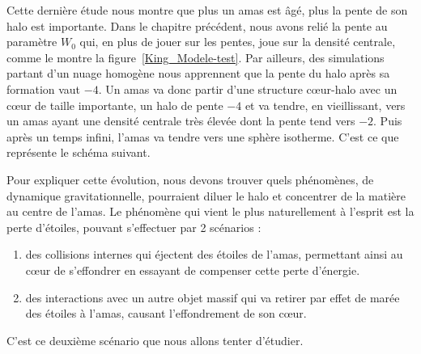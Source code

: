		Cette dernière étude nous montre que plus un amas est âgé, plus la pente de son halo est importante.
		Dans le chapitre précédent, nous avons relié la pente au paramètre $W_0$ qui, en plus de jouer sur les pentes, joue sur la densité centrale, comme le montre la figure~\ref{King_Modele-test}.
		Par ailleurs, des simulations partant d'un nuage homogène nous apprennent que la pente du halo après sa formation vaut $-4$.
		Un amas va donc partir d'une structure cœur-halo avec un cœur de taille importante, un halo de pente $-4$ et va tendre, en vieillissant, vers un amas ayant une densité centrale très élevée dont la pente tend vers $-2$.
		Puis après un temps infini, l'amas va tendre vers une sphère isotherme.
		C'est ce que représente le schéma suivant.

		

		Pour expliquer cette évolution, nous devons trouver quels phénomènes, de dynamique gravitationnelle, pourraient diluer le halo et concentrer de la matière au centre de l'amas. Le phénomène qui vient le plus naturellement à l'esprit est la perte d'étoiles, pouvant s'effectuer par 2 scénarios :
		\begin{enumerate}
			\item des collisions internes qui éjectent des étoiles de l'amas, permettant ainsi au cœur de s'effondrer en essayant de compenser cette perte d'énergie.
			\item des interactions avec un autre objet massif qui va retirer par effet de marée des étoiles à l'amas, causant l'effondrement de son cœur.
		\end{enumerate}
		C'est ce deuxième scénario que nous allons tenter d'étudier.

















